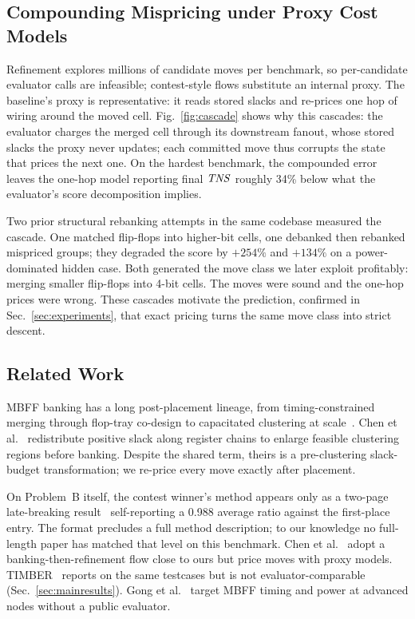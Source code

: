\subsection{Compounding Mispricing under Proxy Cost Models}
\label{sec:proxy}

Refinement explores millions of candidate moves per benchmark, so per-candidate evaluator calls are infeasible; contest-style flows substitute an internal proxy. The baseline's proxy is representative: it reads stored slacks and re-prices one hop of wiring around the moved cell. Fig.~\ref{fig:cascade} shows why this cascades: the evaluator charges the merged cell through its downstream fanout, whose stored slacks the proxy never updates; each committed move thus corrupts the state that prices the next one. On the hardest benchmark, the compounded error leaves the one-hop model reporting final $\mathit{TNS}$ roughly 34\% below what the evaluator's score decomposition implies.

Two prior structural rebanking attempts in the same codebase measured the cascade. One matched flip-flops into higher-bit cells, one debanked then rebanked mispriced groups; they degraded the score by $+254\%$ and $+134\%$ on a power-dominated hidden case. Both generated the move class we later exploit profitably: merging smaller flip-flops into 4-bit cells. The moves were sound and the one-hop prices were wrong. These cascades motivate the prediction, confirmed in Sec.~\ref{sec:experiments}, that exact pricing turns the same move class into strict descent.

\subsection{Related Work}
\label{sec:related}

MBFF banking has a long post-placement lineage, from timing-constrained merging through flop-tray co-design to capacitated clustering at scale~\cite{chang2010postplacement,shyu2013effective,kahng2016floptray,kahng2024scalable}. Chen et al.~\cite{chen2024slackredist} redistribute positive slack along register chains to enlarge feasible clustering regions before banking. Despite the shared term, theirs is a pre-clustering slack-budget transformation; we re-price every move exactly after placement.

On Problem~B itself, the contest winner's method appears only as a two-page late-breaking result~\cite{li2025lbr} self-reporting a 0.988 average ratio against the first-place entry. The format precludes a full method description; to our knowledge no full-length paper has matched that level on this benchmark. Chen et al.~\cite{chen2026agile} adopt a banking-then-refinement flow close to ours but price moves with proxy models. TIMBER~\cite{dassarma2026timber} reports on the same testcases but is not evaluator-comparable (Sec.~\ref{sec:mainresults}). Gong et al.~\cite{gong2025iscas} target MBFF timing and power at advanced nodes without a public evaluator.

